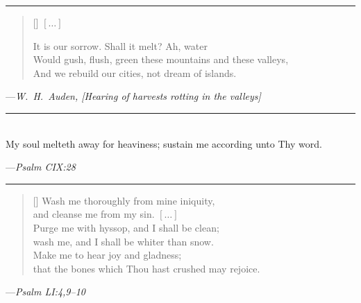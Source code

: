 \documentclass[letter,11pt,openany]{memoir}
\newcommand{\HgEllipsis}{\ensuremath{\left[\ldots\right]}}
\newcommand{\HgSource}[1]{\hfill{\small---\itshape{#1}}}
\newcommand{\HgFill}{\vfill \hrule \vfill}
\newenvironment{HgEnglish}{\strut\\\noindent}{\vspace{1em}}
\newcommand{\SSrc}{\textsuperscript{\upshape{[S]}}}
\begin{document}


\HgFill

\settowidth{\versewidth}{Would gush, flush, green these mountains and these
valleys}
\begin{verse}[\versewidth]
  \HgEllipsis

  It is our sorrow. Shall it melt? Ah, water \\
  Would gush, flush, green these mountains and these valleys, \\
  And we rebuild our cities, not dream of islands.
\end{verse}

\HgSource{W.~H.~Auden, [Hearing of harvests rotting in the valleys]}

\HgFill

\begin{HgEnglish}
  My soul melteth away for heaviness; sustain me according unto Thy word.
\end{HgEnglish}

  \HgSource{Psalm CIX:28 \SSrc}

\HgFill

\settowidth{\versewidth}{\vin that the bones which Thou hast crushed may
rejoice}
\begin{verse}[\versewidth]
  Wash me thoroughly from mine iniquity, \\
  \vin and cleanse me from my sin. \HgEllipsis \\
  Purge me with hyssop, and I shall be clean; \\
  \vin wash me, and I shall be whiter than snow. \\
  Make me to hear joy and gladness; \\
  \vin that the bones which Thou hast crushed may rejoice.
\end{verse}
\HgSource{Psalm LI:4,9--10 \SSrc}
\end{document}
